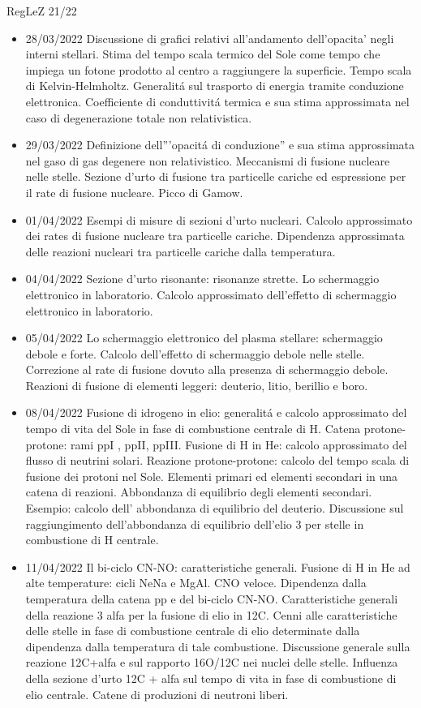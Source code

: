 \begin{frame}[allowframebreaks]{RegLeZ 21/22}
\begin{itemize}
\item 28/03/2022 Discussione di grafici relativi all'andamento dell'opacita' negli interni stellari. Stima del tempo scala termico del Sole come tempo che impiega un fotone prodotto al centro a raggiungere la superficie. Tempo scala di Kelvin-Helmholtz. Generalit\'a sul trasporto di energia tramite conduzione elettronica. Coefficiente di conduttivit\'a termica e sua stima approssimata nel caso di degenerazione totale non relativistica.
\item 29/03/2022 Definizione dell'''opacit\'a di conduzione'' e sua stima approssimata nel gaso di gas degenere non relativistico. Meccanismi di fusione nucleare nelle stelle. Sezione d'urto di fusione tra particelle cariche ed espressione per il rate di fusione nucleare. Picco di Gamow.
\item 01/04/2022 Esempi di misure di sezioni d'urto nucleari. Calcolo approssimato dei rates di fusione nucleare tra particelle cariche. Dipendenza approssimata delle reazioni nucleari tra particelle cariche dalla temperatura.
\item 04/04/2022 Sezione d'urto risonante: risonanze strette. Lo schermaggio elettronico in laboratorio. Calcolo approssimato dell'effetto di schermaggio elettronico in laboratorio.
\item 05/04/2022 Lo schermaggio elettronico del plasma stellare: schermaggio debole e forte. Calcolo dell'effetto di schermaggio debole nelle stelle. Correzione al rate di fusione dovuto alla presenza di schermaggio debole. Reazioni di fusione di elementi leggeri: deuterio, litio, berillio e boro.
\item 08/04/2022 Fusione di idrogeno in elio: generalit\'a e calcolo approssimato del tempo di vita del Sole in fase di combustione centrale di H. Catena protone-protone: rami ppI , ppII, ppIII. Fusione di H in He: calcolo approssimato del flusso di neutrini solari. Reazione protone-protone: calcolo del tempo scala di fusione dei protoni nel Sole. Elementi primari ed elementi secondari in una catena di reazioni. Abbondanza di equilibrio degli elementi secondari. Esempio: calcolo dell' abbondanza di equilibrio del deuterio. Discussione sul raggiungimento dell'abbondanza di equilibrio dell'elio 3 per stelle in combustione di H centrale.
\item 11/04/2022 Il bi-ciclo CN-NO: caratteristiche generali. Fusione di H in He ad alte temperature: cicli NeNa e MgAl. CNO veloce. Dipendenza dalla temperatura della catena pp e del bi-ciclo CN-NO. Caratteristiche generali della reazione 3 alfa per la fusione di elio in 12C. Cenni alle caratteristiche delle stelle in fase di combustione centrale di elio determinate dalla dipendenza dalla temperatura di tale combustione. Discussione generale sulla reazione 12C+alfa e sul rapporto 16O/12C nei nuclei delle stelle. Influenza della sezione d'urto 12C + alfa sul tempo di vita in fase di combustione di elio centrale. Catene di produzioni di neutroni liberi. 

\end{itemize}
\end{frame}
